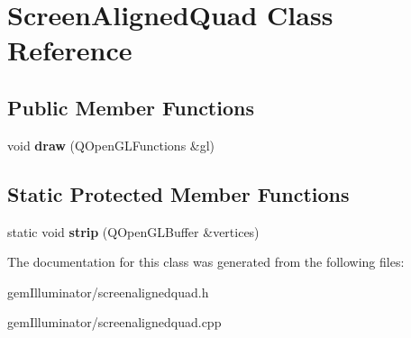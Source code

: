 \hypertarget{class_screen_aligned_quad}{}\section{Screen\+Aligned\+Quad Class Reference}
\label{class_screen_aligned_quad}
\subsection*{Public Member Functions}
\begin{DoxyCompactItemize}
\item 
\hypertarget{class_screen_aligned_quad_ac288d2712b9846afb5077af53b454761}{}void {\bfseries draw} (Q\+Open\+G\+L\+Functions \&gl)\label{class_screen_aligned_quad_ac288d2712b9846afb5077af53b454761}

\end{DoxyCompactItemize}
\subsection*{Static Protected Member Functions}
\begin{DoxyCompactItemize}
\item 
\hypertarget{class_screen_aligned_quad_a103c649c457d5fcaf90d3f8ed4b7e208}{}static void {\bfseries strip} (Q\+Open\+G\+L\+Buffer \&vertices)\label{class_screen_aligned_quad_a103c649c457d5fcaf90d3f8ed4b7e208}

\end{DoxyCompactItemize}


The documentation for this class was generated from the following files\+:\begin{DoxyCompactItemize}
\item 
gem\+Illuminator/screenalignedquad.\+h\item 
gem\+Illuminator/screenalignedquad.\+cpp\end{DoxyCompactItemize}
